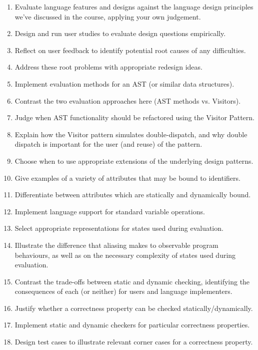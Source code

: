 \documentclass{article}
\begin{document}
\begin{itemize}
\begin{enumerate}
        \item Evaluate language features and designs against the language design principles we've discussed in the course, applying your own judgement.
        \item Design and run user studies to evaluate design questions empirically.
        \item Reflect on user feedback to identify potential root causes of any difficulties.
        \item Address these root problems with appropriate redesign ideas.
        \item Implement evaluation methods for an AST (or similar data structures).
        \item Contrast the two evaluation approaches here (AST methods vs. Visitors).
        \item Judge when AST functionality should be refactored using the Visitor Pattern.
        \item Explain how the Visitor pattern simulates double-dispatch, and why double dispatch is important for the user (and reuse) of the pattern.
        \item Choose when to use appropriate extensions of the underlying design patterns.
        \item Give examples of a variety of attributes that may be bound to identifiers.
        \item Differentiate between attributes which are statically and dynamically bound.
        \item Implement language support for standard variable operations.
        \item Select appropriate representations for states used during evaluation.
        \item Illustrate the difference that aliasing makes to observable program behaviours, as well as on the necessary complexity of states used during evaluation.
        \item Contrast the trade-offs between static and dynamic checking, identifying the consequences of each (or neither) for users and language implementers.
        \item Justify whether a correctness property can be checked statically/dynamically.
        \item Implement static and dynamic checkers for particular correctness properties.
        \item Design test cases to illustrate relevant corner cases for a correctness property.
    \end{enumerate}

\end{itemize}
\end{document}
